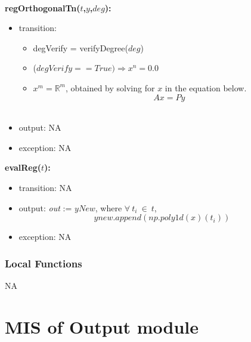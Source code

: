\documentclass[12pt, titlepage]{article}
\begin{document}
~\newline
~\newline

\noindent \textbf{regOrthogonalTn($t$,$y$,$deg$):}
\begin{itemize}
\item transition: 
\begin{itemize}
	\item degVerify = verifyDegree($deg$)
	\item ($degVerify == True) \Longrightarrow  x ^ n = 0.0$ 
	\item $x ^ m = \mathbb{R}^m$, obtained by solving for $x$ in the 
	equation below.
		\begin{equation*}
		Ax = Py
		\end{equation*}\\
	\end{itemize}	
	\item output: NA
	
	
	\item exception: NA
\end{itemize}


\noindent \textbf{evalReg($t$):}
\begin{itemize}
	\item transition: NA
	\item output: \textit{out} := $yNew$, where
	$ \forall\ t_i\ \in\ t$,  
	\begin{equation*}
	ynew.append(np.poly1d(x)(t_i))
	\end{equation*}
	\item exception: NA
\end{itemize}

\subsubsection{Local Functions}

NA








\section{MIS of Output module} \label{mOutput}
\end{document}
